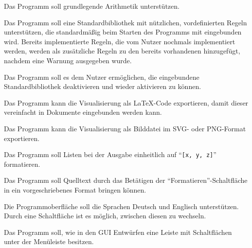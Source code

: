 \documentclass[parskip=full,11pt,twoside]{scrartcl}
\begin{document}

Das Programm soll grundlegende Arithmetik unterstützen.


Das Programm soll eine Standardbibliothek mit nützlichen, vordefinierten Regeln unterstützen, die standardmäßig beim Starten des Programms mit eingebunden wird. Bereits implementierte Regeln, die vom Nutzer nochmals implementiert werden, werden als zusätzliche Regeln zu den bereits vorhandenen hinzugefügt, nachdem eine Warnung ausgegeben wurde.


Das Programm soll es dem Nutzer ermöglichen, die eingebundene Standardbibliothek deaktivieren und wieder aktivieren zu können.


Das Programm kann die Visualisierung als LaTeX-Code exportieren, damit dieser vereinfacht in Dokumente eingebunden werden kann.


Das Programm kann die Visualisierung als Bilddatei im SVG- oder PNG-Format exportieren.


Das Programm soll Listen bei der Ausgabe einheitlich auf \enquote{\texttt{[x, y, z]}} formatieren.


Das Programm soll Quelltext durch das Betätigen der \enquote{Formatieren}-Schaltfläche in ein vorgeschriebenes Format bringen können.


Die Programmoberfläche soll die Sprachen Deutsch und Englisch unterstützen. Durch eine Schaltfläche ist es möglich, zwischen diesen zu wechseln.


Das Programm soll, wie in den GUI Entwürfen eine Leiste mit Schaltflächen unter der Menüleiste besitzen.
\end{document}
